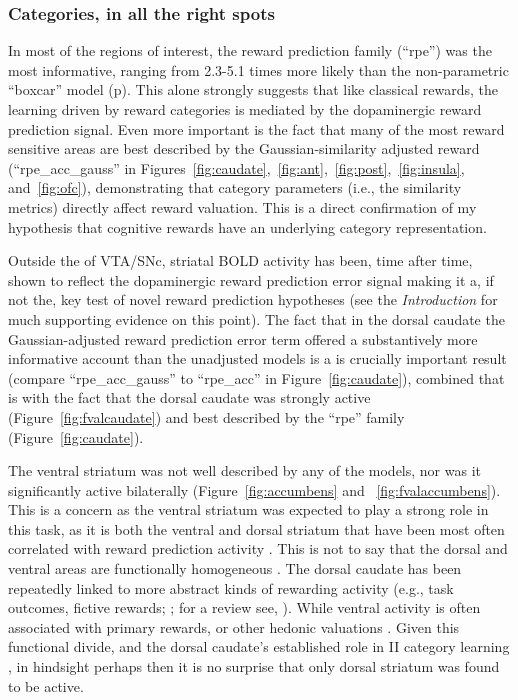 \subsubsection{Categories, in all the right spots}
\label{subsub:rightspots}
In most of the regions of interest, the reward prediction family (``rpe'') was the most informative, ranging from 2.3-5.1 times more likely than the non-parametric ``boxcar'' model (p\pageref{subsub:belowctx}).  This alone strongly suggests that like classical rewards, the learning driven by reward categories is mediated by the dopaminergic reward prediction signal.  Even more important is the fact that many of the most reward sensitive areas are best described by the Gaussian-similarity adjusted reward (``rpe\_acc\_gauss'' in Figures~\ref{fig:caudate},~\ref{fig:ant},~\ref{fig:post},~\ref{fig:insula}, and~\ref{fig:ofc}), demonstrating that category parameters (i.e., the similarity metrics) directly affect reward valuation.  This is a direct confirmation of my hypothesis that cognitive rewards have an underlying category representation.

Outside the of VTA/SNc, striatal BOLD activity has been, time after time, shown to reflect the dopaminergic reward prediction error signal making it a, if not the, key test of novel reward prediction hypotheses (see the \emph{Introduction} for much supporting evidence on this point).  The fact that in the dorsal caudate the Gaussian-adjusted reward prediction error term offered a substantively more informative account than the unadjusted models is a is crucially important result (compare ``rpe\_acc\_gauss'' to ``rpe\_acc'' in Figure~\ref{fig:caudate}), combined that is with the fact that the dorsal caudate was strongly active (Figure~\ref{fig:fvalcaudate}) and best described by the ``rpe'' family (Figure~\ref{fig:caudate}).  
 
The ventral striatum was not well described by any of the models, nor was it significantly active bilaterally (Figure~\ref{fig:accumbens} and ~\ref{fig:fvalaccumbens}).  This is a concern as the ventral striatum was expected to play a strong role in this task, as it is both the ventral and dorsal striatum that have been most often correlated with reward prediction activity \cite{ODoherty:2003p6329,Knutson:2007p1687,Schonberg:2007p518}.  This is not to say that the dorsal and ventral areas are functionally homogeneous \cite{Schonberg:2009p6669,ODoherty:2004p1269,Atallah:2007p1746}.  The dorsal caudate has been repeatedly linked to more abstract kinds of rewarding activity (e.g., task outcomes, fictive rewards; ; for a review see, ).  While ventral activity is  often associated with primary rewards, or other hedonic valuations \cite{ODoherty:2004p1269}.  Given this functional divide, and the dorsal caudate's established role in II category learning \cite{Ashby:1998p9716}, in hindsight perhaps then it is no surprise that only dorsal striatum was found to be active.

